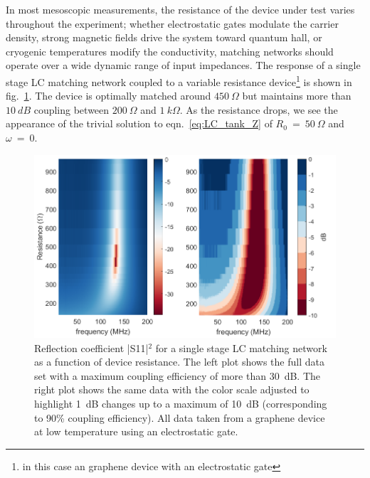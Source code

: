 In most mesoscopic measurements, the resistance of the device under test varies throughout the experiment; whether electrostatic gates modulate the carrier density, strong magnetic fields drive the system toward quantum hall, or cryogenic temperatures modify the conductivity, matching networks should operate over a wide dynamic range of input impedances. The response of a single stage LC matching network coupled to a variable resistance device\footnote{in this case an graphene device with an electrostatic gate} is shown in fig.~\ref{fig:S11vsR}. The device is optimally matched around $450~\Omega$ but maintains more than $10~dB$ coupling between $200~\Omega$ and $1~k\Omega$. As the resistance drops, we see the appearance of the trivial solution to eqn.~\ref{eq:LC_tank_Z} of $R_0~=~50~\Omega$ and $\omega~=~0$. 
\begin{figure}
\centering
\includegraphics[width=120mm]{figures/Johnson_noise_thermometry/S11vsR.png}
\caption{Reflection coefficient |S11|$^2$ for a single stage LC matching network as a function of device resistance. The left plot shows the full data set with a maximum coupling efficiency of more than 30~dB. The right plot shows the same data with the color scale adjusted to highlight 1~dB changes up to a maximum of 10~dB (corresponding to 90\% coupling efficiency). All data taken from a graphene device at low temperature using an electrostatic gate.}
\label{fig:S11vsR}
\end{figure}

